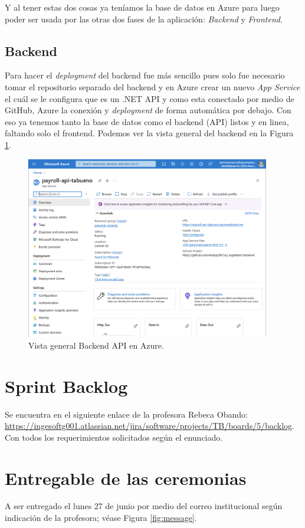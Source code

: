 \documentclass{article}
\begin{document}
Y al tener estas dos cosas ya teníamos la base de datos en Azure para luego poder ser usada
por las otras dos fases de la aplicación: \textit{Backend} y \textit{Frontend}.

\subsection{Backend}
Para hacer el \textit{deployment} del backend fue más sencillo pues solo fue necesario
tomar el repositorio separado del backend y en Azure crear un nuevo \textit{App Service}
el cuál se le configura que es un .NET API y como esta conectado por medio de GitHub, Azure
la conexión y \textit{deployment} de forma automática por debajo. Con eso ya tenemos
tanto la base de datos como el backend (API) listos y en linea, faltando solo el frontend.
Podemos ver la vista general del backend en la Figura \ref{fig:backend}.
\begin{figure}[h]
  \centering
  \includegraphics[width=0.95\textwidth]{backend.png}
  \caption{Vista general Backend API en Azure.}
  \label{fig:backend}
 \end{figure}

\section{Sprint Backlog}
Se encuentra en el siguiente enlace de la profesora Rebeca Obando: \url{https://ingesoftg001.atlassian.net/jira/software/projects/TB/boards/5/backlog}.
Con todos los requerimientos solicitados según el enunciado.

\section{Entregable de las ceremonias}
A ser entregado el lunes 27 de junio por medio del correo institucional según
indicación de la profesora; véase Figura \ref{fig:message}.
\end{document}
